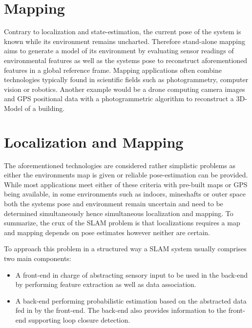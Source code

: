 \section{Mapping}
Contrary to localization and state-estimation, the current pose of the system is known while its environment remains uncharted.
Therefore stand-alone mapping aims to generate a model of its environment by evaluating sensor readings of environmental features as well as the systems pose to reconstruct aforementioned features in a global reference frame. 
Mapping applications often combine technologies typically found in scientific fields such as photogrammetry, computer vision or robotics. 
Another example would be a drone computing camera images and GPS positional data with a photogrammetric algorithm to reconstruct a 3D-Model of a building. 


\section{Localization and Mapping}
The aforementioned technologies are considered rather simplistic problems as either the environments map is given or reliable pose-estimation can be provided. While most applications meet either of these criteria with pre-built maps or GPS being available, in some environments such as indoors, mineshafts or outer space both the systems pose and environment remain uncertain and need to be determined simultaneously hence simultaneous localization and mapping. 
To summarize, the crux of the SLAM problem is that localizations requires a map and mapping depends on pose estimates however neither are certain. 

To approach this problem in a structured way a SLAM system usually comprises two main components:
\begin{itemize}
	\item A front-end in charge of abstracting sensory input to be used in the back-end by performing feature extraction as well as data association. 
	\item A back-end performing probabilistic estimation based on the abstracted data fed in by the front-end. The back-end also provides information to the front-end supporting loop closure detection. 
\end{itemize}

